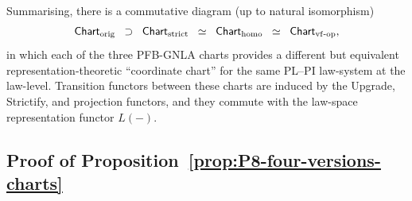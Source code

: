 \documentclass[11pt]{book}
\theoremstyle{plain}
\theoremstyle{definition}
\begin{document}
\begin{proposition}
\begin{enumerate}
    Summarising, there is a commutative diagram (up to natural
    isomorphism)
    \[
      \mathsf{Chart}_{\mathrm{orig}}
      \;\;\supset\;\;
      \mathsf{Chart}_{\mathrm{strict}}
      \;\;\simeq\;\;
      \mathsf{Chart}_{\mathrm{homo}}
      \;\;\simeq\;\;
      \mathsf{Chart}_{\mathrm{vf\text- op}},
    \]
    in which each of the three PFB-GNLA charts provides a different
    but equivalent \\representation-theoretic ``coordinate chart'' for
    the same PL--PI law-system at the law-level.  Transition functors
    between these charts are induced by the Upgrade, Strictify, and
    projection functors, and they commute with the law-space
    representation functor \(L(-)\).
\end{enumerate}
\end{proposition}



\subsection*{Proof of Proposition~\ref{prop:P8-four-versions-charts}}
\end{document}
